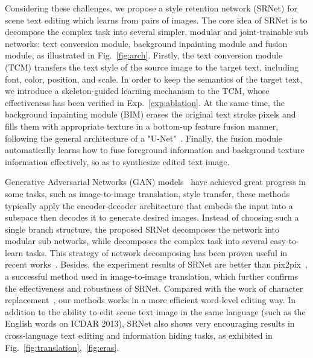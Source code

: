 \documentclass[sigconf]{acmart}
\begin{document}
Considering these challenges, we propose a style retention network (SRNet) for scene text editing which learns from pairs of images.
The core idea of SRNet is to decompose the complex task into several simpler, modular and joint-trainable sub networks: text conversion module, background inpainting module and fusion module, as illustrated in Fig.~\ref{fig:arch}. Firstly, the text conversion module (TCM) transfers the text style of the source image to the target text, including font, color, position, and scale. In order to keep the semantics of the target text, we introduce a skeleton-guided learning mechanism to the TCM, whose effectiveness has been verified in Exp.~\ref{exp:ablation}. At the same time, the background inpainting module (BIM) erases the original text stroke pixels and fills them with appropriate texture in a bottom-up feature fusion manner, following the general architecture of a "U-Net"~\cite{ronneberger2015u}. Finally, the fusion module automatically learns how to fuse foreground information and background texture information effectively, so as to synthesize edited text image.

Generative Adversarial Networks (GAN) models~\cite{goodfellow2014generative,isola2017image,zhu2017unpaired} have achieved great progress in some tasks, such as image-to-image translation, style transfer, these methods typically apply the encoder-decoder architecture that embeds the input into a subspace then decodes it to generate desired images. Instead of choosing such a single branch structure, the proposed SRNet decomposes the network into modular sub networks, while decomposes the complex task into several easy-to-learn tasks. This strategy of network decomposing has been proven useful in recent works~\cite{andreas2016learning,balakrishnan2018synthesizing}. Besides, the experiment results of SRNet are better than pix2pix~\cite{isola2017image}, a successful method used in image-to-image translation, which further confirms the effectiveness and robustness of SRNet. Compared with the work of character replacement~\cite{roy2019stefann}, our methods works in a more efficient word-level editing way. In addition to the ability to edit scene text image in the same language (such as the English words on ICDAR 2013), SRNet also shows very encouraging results in cross-language text editing and information hiding tasks, as exhibited in Fig.~\ref{fig:translation},~\ref{fig:eras}.  
\end{document}
